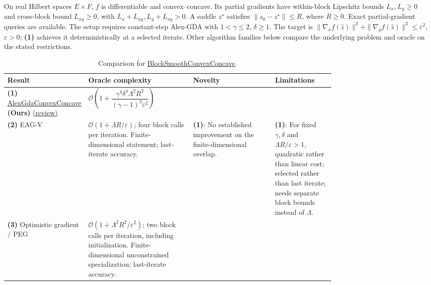 \begin{table}[tp]
\centering
\caption{Comparison for \href{https://github.com/k3nfalt/longtails/blob/main/LongTails/Setups/BlockSmoothConvexConcave.lean}{BlockSmoothConvexConcave}.}\label{tab:BlockSmoothConvexConcave}
\parbox{\linewidth}{\footnotesize On real Hilbert spaces $E\times F$, $f$ is differentiable and convex--concave. Its partial gradients have within-block Lipschitz bounds $L_x,L_y\ge0$ and cross-block bound $L_{xy}\ge0$, with $L_x+L_{xy},L_y+L_{xy}>0$. A saddle $z^\star$ satisfies $\|z_0-z^\star\|\le R$, where $R\ge0$. Exact partial-gradient queries are available. The setup requires constant-step Alex-GDA with $1<\gamma\le2$, $\delta\ge1$. The target is $\|\nabla_x f(\widehat z)\|^2+\|\nabla_y f(\widehat z)\|^2\le\varepsilon^2$, $\varepsilon>0$; \textbf{(1)} achieves it deterministically at a selected iterate. Other algorithm families below compare the underlying problem and oracle on the stated restrictions.}\par\smallskip
\begin{threeparttable}
\footnotesize
\setlength{\tabcolsep}{4pt}\renewcommand{\arraystretch}{1.25}
\begin{tabularx}{\linewidth}{@{}>{\raggedright\arraybackslash}p{0.20\linewidth}>{\raggedright\arraybackslash}p{0.32\linewidth}>{\raggedright\arraybackslash}p{0.25\linewidth}>{\raggedright\arraybackslash}X@{}}
\toprule
\textbf{Result} & \textbf{Oracle complexity} & \textbf{Novelty} & \textbf{Limitations} \\
\midrule
\textbf{(1)} \href{https://github.com/k3nfalt/longtails/blob/main/LongTails/Theorems/AlexGdaConvexConcave.lean}{Alex\allowbreak Gda\allowbreak Convex\allowbreak Concave} \textbf{(Ours)} \href{https://github.com/k3nfalt/longtails/blob/main/scripts/reviews/AlexGdaConvexConcave.md}{(review)}
& $\mathcal{O}\!\left(1+\dfrac{\gamma^4\delta^4\Lambda^2R^2}{(\gamma-1)^3\varepsilon^2}\right)$ & & \\
\midrule[1.2pt]
\textbf{(2)} EAG-V \citep[Cor.~2]{bscYoonRyu2021}
& $\mathcal{O}(1+\Lambda R/\varepsilon)$; four block calls per iteration. Finite-dimensional statement; last-iterate accuracy.
& \textbf{(1)}: No established improvement on the finite-dimensional overlap.
& \textbf{(1)}: For fixed $\gamma,\delta$ and $\Lambda R/\varepsilon>1$, quadratic rather than linear cost; selected rather than last iterate; needs separate block bounds instead of $\Lambda$. \\
\midrule
\textbf{(3)} Optimistic gradient / PEG \citep[Thm.~1]{bscGorbunov2022v2}
& $\mathcal{O}(1+\Lambda^2R^2/\varepsilon^2)$; two block calls per iteration, including initialization. Finite-dimensional unconstrained specialization; last-iterate accuracy.

\end{tabularx}
\end{threeparttable}
\end{table}
